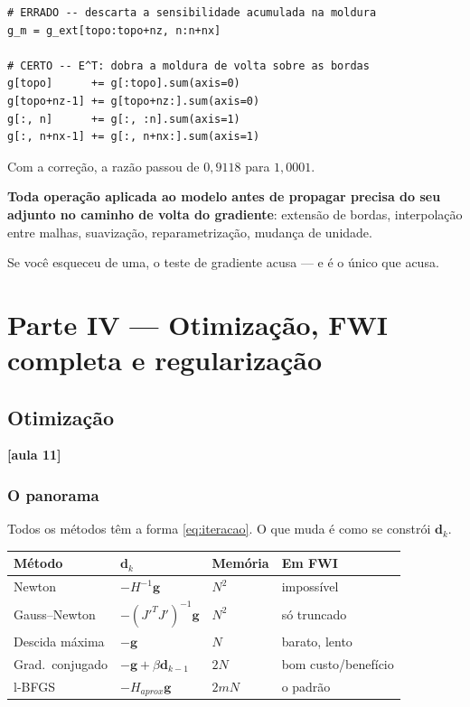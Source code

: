 \documentclass[11pt,a4paper,oneside]{report}
\newcommand{\aula}[1]{\textcolor{cianofwi}{\textbf{[aula #1]}}}
\begin{document}
\begin{lstlisting}
# ERRADO -- descarta a sensibilidade acumulada na moldura
g_m = g_ext[topo:topo+nz, n:n+nx]

# CERTO -- E^T: dobra a moldura de volta sobre as bordas
g[topo]      += g[:topo].sum(axis=0)
g[topo+nz-1] += g[topo+nz:].sum(axis=0)
g[:, n]      += g[:, :n].sum(axis=1)
g[:, n+nx-1] += g[:, n+nx:].sum(axis=1)
\end{lstlisting}

Com a correção, a razão passou de $0{,}9118$ para $1{,}0001$.

\begin{teoria}
\textbf{Toda operação aplicada ao modelo antes de propagar precisa do seu
adjunto no caminho de volta do gradiente}: extensão de bordas, interpolação
entre malhas, suavização, reparametrização, mudança de unidade.

Se você esqueceu de uma, o teste de gradiente acusa --- e é o único que acusa.
\end{teoria}

\part*{\centering\color{azulfwi} Parte IV --- Otimização, FWI completa e regularização}

\chapter{Otimização}
\label{cap:otimizacao}

\aula{11}

\section{O panorama}

Todos os métodos têm a forma \eqref{eq:iteracao}. O que muda é como se
constrói $\mathbf{d}_k$.

\begin{center}
\begin{tabular}{@{}llll@{}}
\toprule
\textbf{Método} & $\mathbf{d}_k$ & \textbf{Memória} & \textbf{Em FWI} \\
\midrule
Newton          & $-H^{-1}\mathbf{g}$ & $N^{2}$ & impossível \\
Gauss--Newton   & $-(J'^TJ')^{-1}\mathbf{g}$ & $N^{2}$ & só truncado \\
Descida máxima  & $-\mathbf{g}$ & $N$ & barato, lento \\
Grad.\ conjugado& $-\mathbf{g} + \beta\mathbf{d}_{k-1}$ & $2N$ & bom custo/benefício \\
l-BFGS          & $-H_{aprox}\mathbf{g}$ & $2mN$ & o padrão \\
\bottomrule
\end{tabular}
\end{center}
\end{document}
